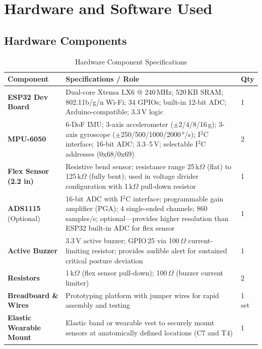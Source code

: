 \documentclass[12pt,a4paper]{report}
\begin{document}
\chapter{Hardware and Software Used}

\section{Hardware Components}

\begin{table}[H]
\centering
\caption{Hardware Component Specifications}
\label{tab:hardware}
\begin{tabularx}{\columnwidth}{lXl}
\toprule
\textbf{Component} & \textbf{Specifications / Role} & \textbf{Qty} \\
\midrule
\textbf{ESP32 Dev Board}
    & Dual-core Xtensa LX6 @ 240\,MHz; 520\,KB SRAM; 802.11b/g/n Wi-Fi; 34 GPIOs; built-in 12-bit ADC; Arduino-compatible; 3.3\,V logic
    & 1 \\[6pt]
\textbf{MPU-6050}
    & 6-DoF IMU; 3-axis accelerometer ($\pm$2/4/8/16\,g); 3-axis gyroscope ($\pm$250/500/1000/2000\,°/s); I$^2$C interface; 16-bit ADC; 3.3--5\,V; selectable I$^2$C addresses (0x68/0x69)
    & 2 \\[6pt]
\textbf{Flex Sensor (2.2 in)}
    & Resistive bend sensor; resistance range 25\,k$\Omega$ (flat) to 125\,k$\Omega$ (fully bent); used in voltage divider configuration with 1\,k$\Omega$ pull-down resistor
    & 1 \\[6pt]
\textbf{ADS1115} (Optional)
    & 16-bit ADC with I$^2$C interface; programmable gain amplifier (PGA); 4 single-ended channels; 860 samples/s; optional—provides higher resolution than ESP32 built-in ADC for flex sensor
    & 1 \\[6pt]
\textbf{Active Buzzer}
    & 3.3\,V active buzzer; GPIO\,25 via 100\,$\Omega$ current-limiting resistor; provides audible alert for sustained critical posture deviation
    & 1 \\[6pt]
\textbf{Resistors}
    & 1\,k$\Omega$ (flex sensor pull-down); 100\,$\Omega$ (buzzer current limiter)
    & 2 \\[6pt]
\textbf{Breadboard \& Wires}
    & Prototyping platform with jumper wires for rapid assembly and testing
    & 1 set \\[6pt]
\textbf{Elastic Wearable Mount}
    & Elastic band or wearable vest to securely mount sensors at anatomically defined locations (C7 and T4)
    & 1 \\
\bottomrule
\end{tabularx}
\end{table}
\end{document}
